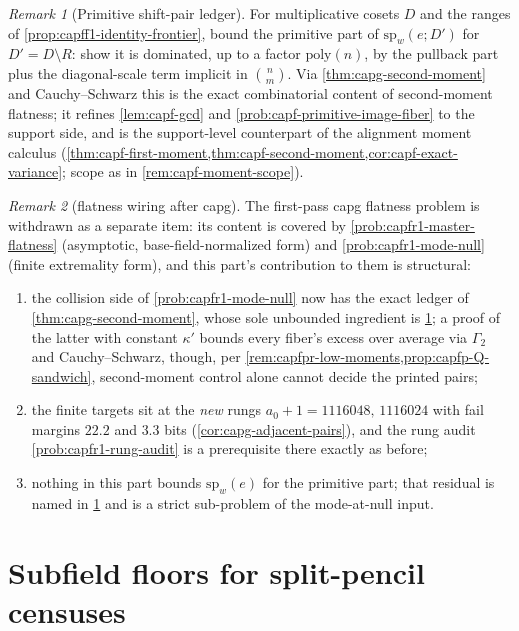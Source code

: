 \documentclass[11pt]{article}
\theoremstyle{definition}
\theoremstyle{remark}
\newtheorem{remark}[remark]{Remark}
\begin{document}
\begin{remark}[Primitive shift-pair ledger]\label{prob:capg-shiftpairs}
For multiplicative cosets $D$ and the ranges of
\cref{prop:capff1-identity-frontier}, bound the primitive part of
$\mathrm{sp}_w(e;D')$ for $D'=D\setminus R$: show it is dominated, up to a
factor $\mathrm{poly}(n)$, by the pullback part plus the diagonal-scale term
implicit in $\binom{n}{m}$.  Via \cref{thm:capg-second-moment} and
Cauchy--Schwarz this is the exact combinatorial content of second-moment
flatness; it refines \cref{lem:capf-gcd} and
\cref{prob:capf-primitive-image-fiber} to the support side, and is the
support-level counterpart of the alignment moment calculus
(\cref{thm:capf-first-moment,thm:capf-second-moment,cor:capf-exact-variance};
scope as in \cref{rem:capf-moment-scope}).
\end{remark}

\begin{remark}[flatness wiring after capg]\label{rem:capg-flatness-wiring}
The first-pass capg flatness problem is withdrawn as a separate item: its
content is covered by \cref{prob:capfr1-master-flatness} (asymptotic,
base-field-normalized form) and \cref{prob:capfr1-mode-null} (finite
extremality form), and this part's contribution to them is structural:
\begin{enumerate}[label=\textup{(\roman*)}]
\item the collision side of \cref{prob:capfr1-mode-null} now has the
exact ledger of \cref{thm:capg-second-moment}, whose sole unbounded
ingredient is \cref{prob:capg-shiftpairs}; a proof of the latter with
constant $\kappa'$ bounds every fiber's excess over average via
$\Gamma_2$ and Cauchy--Schwarz, though, per
\cref{rem:capfpr-low-moments,prop:capfp-Q-sandwich}, second-moment control
alone cannot decide the printed pairs;
\item the finite targets sit at the \emph{new} rungs
$a_0+1=1116048,\,1116024$ with fail margins $22.2$ and $3.3$ bits
(\cref{cor:capg-adjacent-pairs}), and the rung audit
\cref{prob:capfr1-rung-audit} is a prerequisite there exactly as before;
\item nothing in this part bounds $\mathrm{sp}_w(e)$ for the primitive
part; that residual is named in \cref{prob:capg-shiftpairs} and is a
strict sub-problem of the mode-at-null input.
\end{enumerate}
\end{remark}

\section{Subfield floors for split-pencil censuses}\label{sec:capg-subfield}
\end{document}
